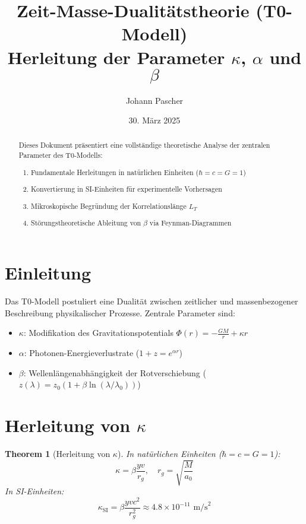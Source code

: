\documentclass{article}
\title{Zeit-Masse-Dualitätstheorie (T0-Modell) \\ Herleitung der Parameter \(\kappa\), \(\alpha\) und \(\beta\)}
\author{Johann Pascher}
\date{30. März 2025}
\newtheorem{theorem}{Theorem}[section]
\begin{document}
	
	\maketitle
	
	\begin{abstract}
		Dieses Dokument präsentiert eine vollständige theoretische Analyse der zentralen Parameter des T0-Modells:
		\begin{enumerate}
			\item Fundamentale Herleitungen in natürlichen Einheiten (\(\hbar = c = G = 1\))
			\item Konvertierung in SI-Einheiten für experimentelle Vorhersagen
			\item Mikroskopische Begründung der Korrelationslänge \(L_T\)
			\item Störungstheoretische Ableitung von \(\beta\) via Feynman-Diagrammen
		\end{enumerate}
	\end{abstract}
	
	\tableofcontents
	\newpage
	
	\section{Einleitung}
	Das T0-Modell postuliert eine Dualität zwischen zeitlicher und massenbezogener Beschreibung physikalischer Prozesse. Zentrale Parameter sind:
	\begin{itemize}
		\item \(\kappa\): Modifikation des Gravitationspotentials \(\Phi(r) = -\frac{GM}{r} + \kappa r\)
		\item \(\alpha\): Photonen-Energieverlustrate (\(1 + z = e^{\alpha r}\))
		\item \(\beta\): Wellenlängenabhängigkeit der Rotverschiebung (\(z(\lambda) = z_0 (1 + \beta \ln(\lambda/\lambda_0))\))
	\end{itemize}
	
	\section{Herleitung von \(\kappa\)}
	\begin{theorem}[Herleitung von \(\kappa\)]
		In natürlichen Einheiten (\(\hbar = c = G = 1\)):
		\begin{equation}
			\kappa = \beta \frac{y v}{r_g}, \quad r_g = \sqrt{\frac{M}{a_0}}
		\end{equation}
		In SI-Einheiten:
		\begin{equation}
			\kappa_{\text{SI}} = \beta \frac{y v c^2}{r_g^2} \approx 4.8 \times 10^{-11} \text{ m/s}^2
		\end{equation}
	\end{theorem}
	
\end{document}
